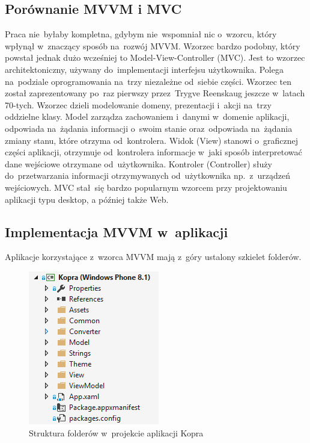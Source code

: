 \documentclass[a4paper,twoside,titlepage,openright]{book}
\begin{document}
\subsection{Porównanie MVVM i MVC}

Praca nie~byłaby kompletna, gdybym nie~wspomniał nic o~wzorcu, który wpłynął w~znaczący sposób na~rozwój MVVM. Wzorzec bardzo podobny, który powstał jednak dużo wcześniej to Model-View-Controller (MVC). Jest to wzorzec architektoniczny, używany do~implementacji interfejsu użytkownika. Polega na~podziale oprogramowania na~trzy niezależne od~siebie części. Wzorzec ten został zaprezentowany po~raz pierwszy przez~Trygve Reenskaug jeszcze w~latach 70-tych.\cite{mvcXerox} Wzorzec dzieli modelowanie domeny, prezentacji i~akcji na~trzy oddzielne klasy. Model zarządza zachowaniem i~danymi w~domenie aplikacji, odpowiada na~żądania informacji o~swoim stanie oraz~odpowiada na~żądania zmiany stanu, które otrzyma od~kontrolera. Widok (View) stanowi o~graficznej części aplikacji, otrzymuje od~kontrolera informacje w~jaki sposób interpretować dane wejściowe otrzymane od~użytkownika. Kontroler (Controller) służy do~przetwarzania informacji otrzymywanych od~użytkownika np.~z~urządzeń wejściowych. MVC stał~się bardzo popularnym wzorcem przy projektowaniu aplikacji typu desktop, a później także Web. 


\subsection{Implementacja MVVM w~aplikacji}
Aplikacje korzystające z~wzorca MVVM mają z~góry ustalony szkielet folderów.

\begin{figure}[h]
	\centering
			\includegraphics[resolution=120]{strukturaFolderow.png}
		\caption{Struktura folderów w~projekcie aplikacji Kopra}
\end{figure}
\end{document}
